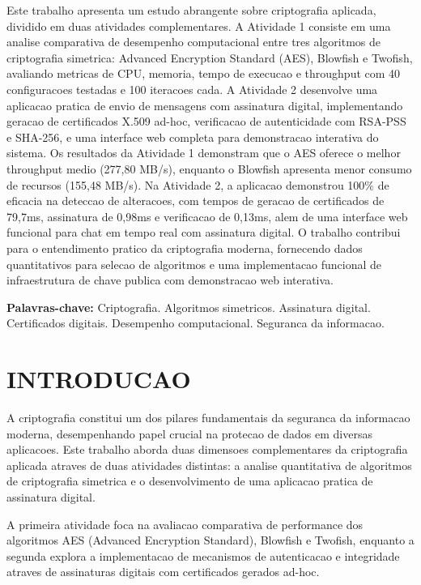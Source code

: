 \documentclass[12pt,a4paper,oneside]{article}
\begin{document}
Este trabalho apresenta um estudo abrangente sobre criptografia aplicada, dividido em duas atividades complementares. A Atividade 1 consiste em uma analise comparativa de desempenho computacional entre tres algoritmos de criptografia simetrica: Advanced Encryption Standard (AES), Blowfish e Twofish, avaliando metricas de CPU, memoria, tempo de execucao e throughput com 40 configuracoes testadas e 100 iteracoes cada. A Atividade 2 desenvolve uma aplicacao pratica de envio de mensagens com assinatura digital, implementando geracao de certificados X.509 ad-hoc, verificacao de autenticidade com RSA-PSS e SHA-256, e uma interface web completa para demonstracao interativa do sistema. Os resultados da Atividade 1 demonstram que o AES oferece o melhor throughput medio (277,80 MB/s), enquanto o Blowfish apresenta menor consumo de recursos (155,48 MB/s). Na Atividade 2, a aplicacao demonstrou 100\% de eficacia na deteccao de alteracoes, com tempos de geracao de certificados de 79,7ms, assinatura de 0,98ms e verificacao de 0,13ms, alem de uma interface web funcional para chat em tempo real com assinatura digital. O trabalho contribui para o entendimento pratico da criptografia moderna, fornecendo dados quantitativos para selecao de algoritmos e uma implementacao funcional de infraestrutura de chave publica com demonstracao web interativa.

\vspace{0.5cm}
\noindent\textbf{Palavras-chave:} Criptografia. Algoritmos simetricos. Assinatura digital. Certificados digitais. Desempenho computacional. Seguranca da informacao.

\newpage
\tableofcontents

\newpage
\section{INTRODUCAO}

A criptografia constitui um dos pilares fundamentais da seguranca da informacao moderna, desempenhando papel crucial na protecao de dados em diversas aplicacoes. Este trabalho aborda duas dimensoes complementares da criptografia aplicada atraves de duas atividades distintas: a analise quantitativa de algoritmos de criptografia simetrica e o desenvolvimento de uma aplicacao pratica de assinatura digital.

A primeira atividade foca na avaliacao comparativa de performance dos algoritmos AES (Advanced Encryption Standard), Blowfish e Twofish, enquanto a segunda explora a implementacao de mecanismos de autenticacao e integridade atraves de assinaturas digitais com certificados gerados ad-hoc.
\end{document}
